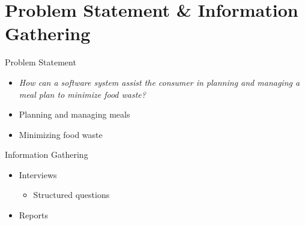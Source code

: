 \section{Problem Statement \& Information Gathering} 
\begin{frame}{Problem Statement}
    \begin{itemize}
        \item \textit{How can a software system assist the consumer in planning and managing a meal plan to minimize food waste?}
    \end{itemize}
        \begin{itemize}
            \item Planning and managing meals
            \item Minimizing food waste
        \end{itemize}
\end{frame}

\begin{frame}{Information Gathering}
    \begin{itemize}
        \item Interviews
        \begin{itemize}
        	\item Structured questions
        \end{itemize}
        \item Reports
    \end{itemize}
\end{frame}


